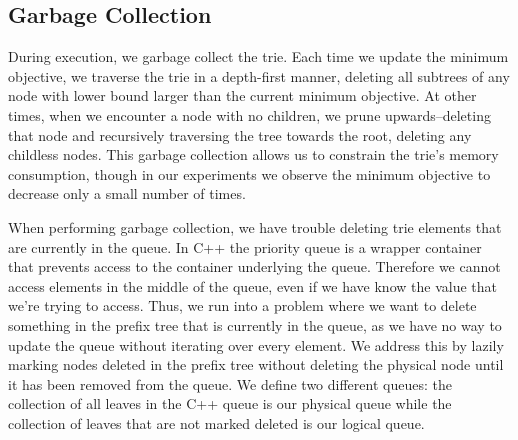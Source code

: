 \subsection{Garbage Collection}
\label{sec:gc}

During execution, we garbage collect the trie.
%
Each time we update the minimum objective,
we traverse the trie in a depth-first manner, deleting all subtrees
of any node with lower bound larger than the current minimum objective.
%
At other times, when we encounter a node with no children, we prune upwards--deleting that
node and recursively traversing the tree towards the root, deleting any childless nodes.
%
This garbage collection allows us to constrain the trie's memory consumption, though in our
experiments we observe the minimum objective to decrease only a
small number of times.

When performing garbage collection, we have trouble deleting trie elements that are currently in the queue.
In C++ the priority queue is a wrapper container that prevents access to the container underlying the queue.
Therefore we cannot access elements in the middle of the queue, even if we have know the value that we're trying to access.
Thus, we run into a problem where we want to delete something in the prefix tree that is currently in the queue, as we have no way to update the queue without iterating over every element.
We address this by lazily marking nodes deleted in the prefix tree without deleting the physical node until it has been removed from the queue.
We define two different queues: the collection of all leaves in the C++ queue is our physical queue while the collection of leaves that are not marked deleted is our logical queue.